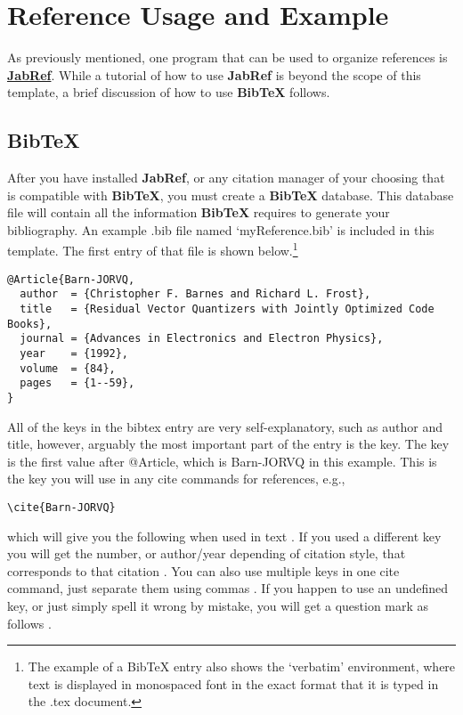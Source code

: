 \section{Reference Usage and Example}

As previously mentioned, one program that can be used to organize references is \href{http://www.jabref.org}{\textbf{JabRef}}. While a tutorial of how to use \textbf{JabRef} is beyond the scope of this template, a brief discussion of how to use \textbf{BibTeX} follows.

\subsection{BibTeX}
After you have installed \textbf{JabRef}, or any citation manager of your choosing that is compatible with \textbf{BibTeX}, you must create a \textbf{BibTeX} database. This database file will contain all the information \textbf{BibTeX} requires to generate your bibliography. An example .bib file named `myReference.bib' is included in this template. The first entry of that file is shown below.\footnote{The example of a BibTeX entry also shows the `verbatim' environment, where text is displayed in monospaced font in the exact format that it is typed in the .tex document.}

{\footnotesize \begin{verbatim}
@Article{Barn-JORVQ,
  author  = {Christopher F. Barnes and Richard L. Frost},
  title   = {Residual Vector Quantizers with Jointly Optimized Code Books},
  journal = {Advances in Electronics and Electron Physics},
  year    = {1992},
  volume  = {84},
  pages   = {1--59},
}
\end{verbatim}}

All of the keys in the bibtex entry are very self-explanatory, such as author and title, however, arguably the most important part of the entry is the key. The key is the first value after @Article, which is Barn-JORVQ in this example. This is the key you will use in any cite commands for references, e.g.,

\begin{verbatim}\cite{Barn-JORVQ}\end{verbatim}

which will give you the following when used in text \cite{Barn-JORVQ}. If you used a different key you will get the number, or author/year depending of citation style, that corresponds to that citation \cite{REALCAR}. You can also use multiple keys in one cite command, just separate them using commas \cite{ANCONS, WAGFJ, einstein}. If you happen to use an undefined key, or just simply spell it wrong by mistake, you will get a question mark as follows \cite{notdefined}.

